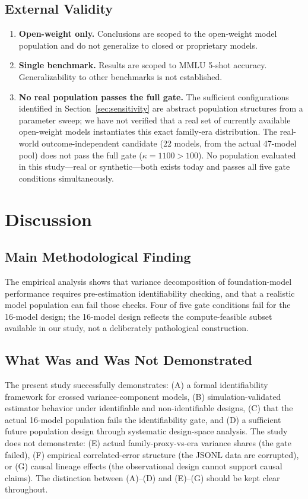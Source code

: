 \documentclass{ieeeaccess}
\theoremstyle{definition}
\theoremstyle{plain}
\begin{document}
\subsection{External Validity}
\begin{enumerate}
\item \textbf{Open-weight only.} Conclusions are scoped to the open-weight model population and do not generalize to closed or proprietary models.
\item \textbf{Single benchmark.} Results are scoped to MMLU 5-shot accuracy. Generalizability to other benchmarks is not established.
\item \textbf{No real population passes the full gate.} The sufficient configurations identified in Section~\ref{sec:sensitivity} are abstract population structures from a parameter sweep; we have not verified that a real set of currently available open-weight models instantiates this exact family-era distribution. The real-world outcome-independent candidate (22 models, from the actual 47-model pool) does not pass the full gate ($\kappa = 1100 > 100$). No population evaluated in this study---real or synthetic---both exists today and passes all five gate conditions simultaneously.
\end{enumerate}

\section{Discussion}
\label{sec:discussion}

\subsection{Main Methodological Finding}
The empirical analysis shows that variance decomposition of foundation-model performance requires pre-estimation identifiability checking, and that a realistic model population can fail those checks. Four of five gate conditions fail for the 16-model design; the 16-model design reflects the compute-feasible subset available in our study, not a deliberately pathological construction.

\subsection{What Was and Was Not Demonstrated}
The present study successfully demonstrates: (A) a formal identifiability framework for crossed variance-component models, (B) simulation-validated estimator behavior under identifiable and non-identifiable designs, (C) that the actual 16-model population fails the identifiability gate, and (D) a sufficient future population design through systematic design-space analysis. The study does not demonstrate: (E) actual family-proxy-vs-era variance shares (the gate failed), (F) empirical correlated-error structure (the JSONL data are corrupted), or (G) causal lineage effects (the observational design cannot support causal claims). The distinction between (A)--(D) and (E)--(G) should be kept clear throughout.
\end{document}
